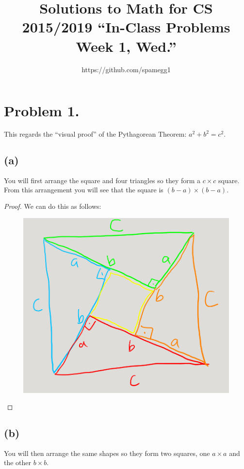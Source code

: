 \documentclass[14pt]{extarticle}
\title{Solutions to Math for CS 2015/2019 ``In-Class Problems Week 1, Wed.''}
\author{https://github.com/spamegg1}
\begin{document}
\maketitle
\tableofcontents
\section{Problem 1.}
This regards the ``visual proof'' of the Pythagorean Theorem: $a^2 + b^2 = c^2$.

\subsection{(a)}

You will first arrange the square and four triangles so they form a $c \times c$ square. From this arrangement you will see that the square is $(b - a) \times (b - a)$.

\begin{proof}
We can do this as follows:
\begin{figure}[ht!]
\centering
\includegraphics[scale=0.25]{onesquare.png}
\end{figure}
\end{proof}

\subsection{(b)}

You will then arrange the same shapes so they form two squares, one $a \times a$ and the other $b \times b$.
\end{document}
